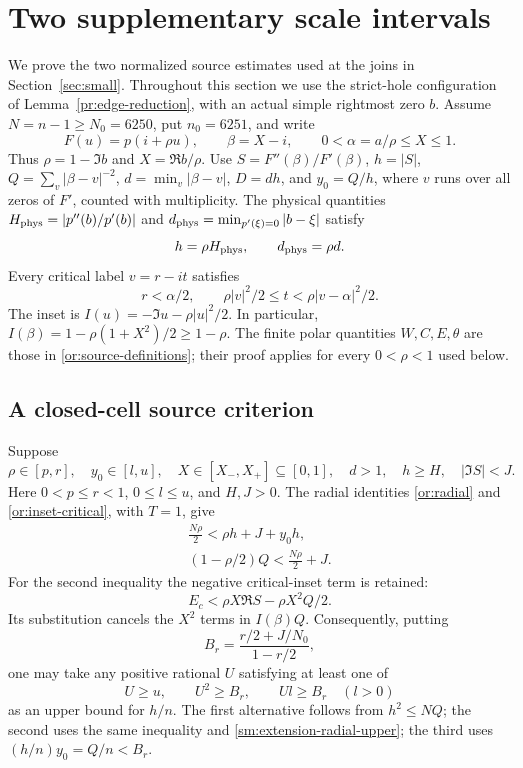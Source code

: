 \section{Two supplementary scale intervals}\label{sec:small-extensions}

We prove the two normalized source estimates used at the joins in
Section~\ref{sec:small}. Throughout this section we use the strict-hole
configuration of Lemma~\ref{pr:edge-reduction}, with an actual simple
rightmost zero $b$. Assume $N=n-1\ge N_0=6250$, put $n_0=6251$,
and write
\[
 F(u)=p(i+\rho u),\qquad \beta=X-i,\qquad
 0<\alpha=a/\rho\le X\le1.
\]
Thus $\rho=1-\Im b$ and $X=\Re b/\rho$. Use
$S=F''(\beta)/F'(\beta)$, $h=|S|$, $Q=\sum_v|\beta-v|^{-2}$,
$d=\min_v|\beta-v|$, $D=dh$, and $y_0=Q/h$, where $v$ runs over
all zeros of $F'$, counted with multiplicity.
The physical quantities $H_{\rm phys}=|p''(b)/p'(b)|$ and
$d_{\rm phys}=\min_{p'(\xi)=0}|b-\xi|$ satisfy
\[
 h=\rho H_{\rm phys},\qquad d_{\rm phys}=\rho d.
\]
Every critical label $v=r-it$ satisfies
\begin{equation}\label{sm:extension-domain}
 r<\alpha/2,\qquad \rho|v|^2/2\le t<\rho|v-\alpha|^2/2.
\end{equation}
The inset is $I(u)=-\Im u-\rho|u|^2/2$. In particular,
$I(\beta)=1-\rho(1+X^2)/2\ge1-\rho$.
The finite polar quantities $W,C,E,\theta$ are those in
\eqref{or:source-definitions}; their proof applies for every
$0<\rho<1$ used below.

\subsection{A closed-cell source criterion}

Suppose
\[
 \rho\in[p,r],\quad y_0\in[l,u],\quad
 X\in[X_-,X_+]\subseteq[0,1],\quad d>1,\quad
 h\ge H,\quad |\Im S|<J.
\]
Here $0<p\le r<1$, $0\le l\le u$, and $H,J>0$.
The radial identities \eqref{or:radial} and
\eqref{or:inset-critical}, with $T=1$, give
\begin{gather}
 \frac{N\rho}{2}<\rho h+J+y_0h,\label{sm:extension-radial-lower}\\
 (1-\rho/2)Q<\frac{N\rho}{2}+J.\label{sm:extension-radial-upper}
\end{gather}
For the second inequality the negative critical-inset term is retained:
\[
 E_c<\rho X\Re S-\rho X^2Q/2.
\]
Its substitution cancels the $X^2$ terms in $I(\beta)Q$.
Consequently, putting
\[
 B_r=\frac{r/2+J/N_0}{1-r/2},
\]
one may take any positive rational $U$ satisfying at least one of
\begin{equation}\label{sm:extension-U}
 U\ge u,\qquad U^2\ge B_r,\qquad Ul\ge B_r\quad(l>0)
\end{equation}
as an upper bound for $h/n$. The first alternative follows from
$h^2\le NQ$; the second uses the same inequality and
\eqref{sm:extension-radial-upper}; the third uses
$(h/n)y_0=Q/n<B_r$.

